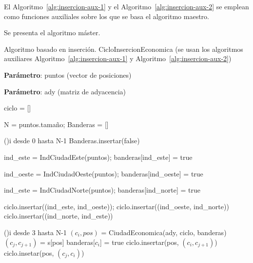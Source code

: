 El Algoritmo~\ref{alg:insercion-aux-1} y el Algoritmo~\ref{alg:insercion-aux-2}
se emplean como funciones auxiliales sobre los que se basa el algoritmo maestro. 

Se presenta el algoritmo máster.

\begin{algorithm}[H]
    \caption{Algoritmo basado en inserción. CicloInsercionEconomica (se usan los algoritmos 
    auxiliares Algoritmo~\ref{alg:insercion-aux-1} y Algoritmo~\ref{alg:insercion-aux-2})}\label{alg:insercion}
    \begin{minipage}{0.92\textwidth}
      \textbf{Parámetro}: puntos (vector de posiciones)
      
      \textbf{Parámetro}: ady (matriz de adyacencia)
    \end{minipage}

    ciclo = []\;

    N = puntos.tamaño;
    Banderas = []\;

    \For(){i desde 0 hasta N-1}{
      Banderas.insertar(false)
    }


    ind\_este = IndCiudadEste(puntos);
    banderas[ind\_este] = true\;

    ind\_oeste = IndCiudadOeste(puntos);
    banderas[ind\_oeste] = true\;

    ind\_este = IndCiudadNorte(puntos);
    banderas[ind\_norte] = true\;


    ciclo.insertar((ind\_este, ind\_oeste));
    ciclo.insertar((ind\_oeste, ind\_norte))\;
    ciclo.insertar((ind\_norte, ind\_este))\;


    \For(){i desde 3 hasta N-1}{
      $(c_i,pos)$ = CiudadEconomica(ady, ciclo, banderas)\;
      $(c_j, c_{j+1})$ = s[pos]\;
      banderas[$c_i$] = true\;
      ciclo.insertar(pos, $(c_i,c_{j+1})$)\;
      ciclo.insetar(pos, $(c_j,c_i)$)\;
    }
\end{algorithm}

